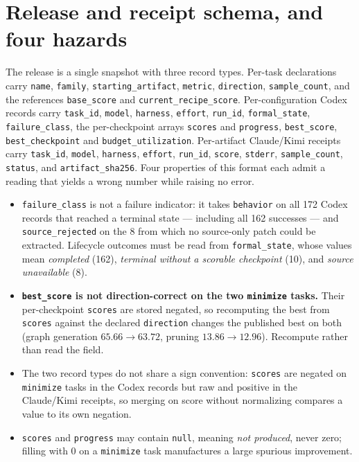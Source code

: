 \section{Release and receipt schema, and four hazards}
\label{app:schema}

The release is a single snapshot with three record types. Per-task declarations carry \texttt{name},
\texttt{family}, \texttt{starting\_artifact}, \texttt{metric}, \texttt{direction},
\texttt{sample\_count}, and the references \texttt{base\_score} and \texttt{current\_recipe\_score}.
Per-configuration Codex records carry \texttt{task\_id}, \texttt{model}, \texttt{harness},
\texttt{effort}, \texttt{run\_id}, \texttt{formal\_state}, \texttt{failure\_class}, the per-checkpoint
arrays \texttt{scores} and \texttt{progress}, \texttt{best\_score}, \texttt{best\_checkpoint} and
\texttt{budget\_utilization}. Per-artifact Claude/Kimi receipts carry \texttt{task\_id}, \texttt{model},
\texttt{harness}, \texttt{effort}, \texttt{run\_id}, \texttt{score}, \texttt{stderr},
\texttt{sample\_count}, \texttt{status}, and \texttt{artifact\_sha256}. Four properties of this format
each admit a reading that yields a wrong number while raising no error.

\begin{itemize}[leftmargin=*,itemsep=2pt,topsep=2pt]
\item \texttt{failure\_class} is not a failure indicator: it takes \texttt{behavior} on all 172 Codex
records that reached a terminal state --- including all 162 successes --- and \texttt{source\_rejected}
on the 8 from which no source-only patch could be extracted. Lifecycle outcomes must be read from
\texttt{formal\_state}, whose values mean \emph{completed} (162), \emph{terminal without a scorable
checkpoint} (10), and \emph{source unavailable} (8).
\item \textbf{\texttt{best\_score} is not direction-correct on the two \texttt{minimize} tasks.} Their
per-checkpoint \texttt{scores} are stored negated, so recomputing the best from \texttt{scores} against
the declared \texttt{direction} changes the published best on both (graph generation
$65.66\rightarrow63.72$, pruning $13.86\rightarrow12.96$). Recompute rather than read the field.
\item The two record types do not share a sign convention: \texttt{scores} are negated on
\texttt{minimize} tasks in the Codex records but raw and positive in the Claude/Kimi receipts, so
merging on score without normalizing compares a value to its own negation.
\item \texttt{scores} and \texttt{progress} may contain \texttt{null}, meaning \emph{not produced},
never zero; filling with $0$ on a \texttt{minimize} task manufactures a large spurious improvement.
\end{itemize}

